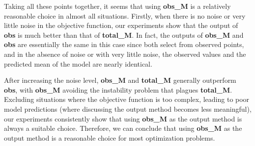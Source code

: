 \documentclass{article}
\begin{document}
\hspace{2em}Taking all these points together, it seems that using \textbf{obs\_M} is a relatively reasonable choice in almost all situations. Firstly, when there is no noise or very little noise in the objective function, our experiments show that the output of \textbf{obs} is much better than that of \textbf{total\_M}. In fact, the outputs of \textbf{obs\_M} and \textbf{obs} are essentially the same in this case since both select from observed points, and in the absence of noise or with very little noise, the observed values and the predicted mean of the model are nearly identical. 

\hspace{2em}After increasing the noise level, \textbf{obs\_M} and \textbf{total\_M} generally outperform \textbf{obs}, with \textbf{obs\_M} avoiding the instability problem that plagues \textbf{total\_M}. Excluding situations where the objective function is too complex, leading to poor model predictions (where discussing the output method becomes less meaningful), our experiments consistently show that using \textbf{obs\_M} as the output method is always a suitable choice. Therefore, we can conclude that using \textbf{obs\_M} as the output method is a reasonable choice for most optimization problems.








\end{document}
